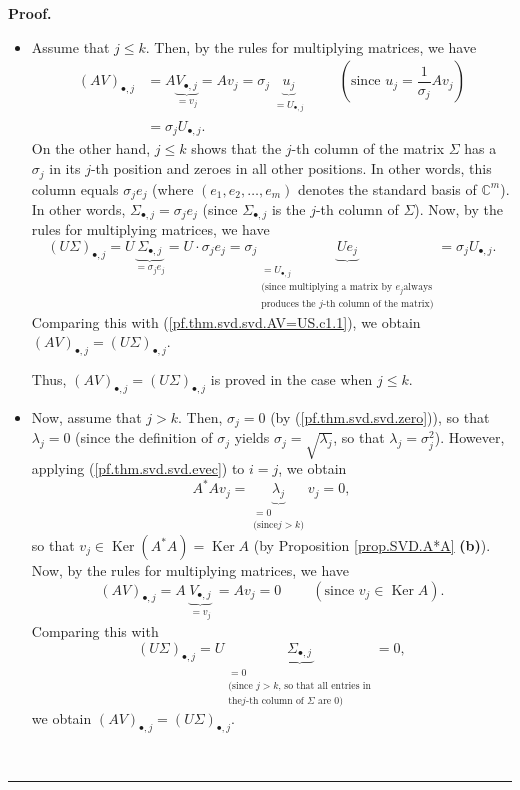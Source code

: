 \documentclass[numbers=enddot,12pt,final,onecolumn,notitlepage]{scrartcl}%
\numberwithin{exer}{subsection}
\theoremstyle{definition}
\newenvironment{proof}[1][Proof]{\noindent\textbf{#1.} }{\ \rule{0.5em}{0.5em}}
\begin{document}
\begin{proof}
\begin{itemize}
\item Assume that $j\leq k$. Then, by the rules for multiplying matrices, we
have%
\begin{align}
\left(  AV\right)  _{\bullet,j}  &  =A\underbrace{V_{\bullet,j}}_{=v_{j}%
}=Av_{j}=\sigma_{j}\underbrace{u_{j}}_{\substack{=U_{\bullet,j}}%
}\ \ \ \ \ \ \ \ \ \ \left(  \text{since }u_{j}=\dfrac{1}{\sigma_{j}}%
Av_{j}\right) \nonumber\\
&  =\sigma_{j}U_{\bullet,j}. \label{pf.thm.svd.svd.AV=US.c1.1}%
\end{align}
On the other hand, $j\leq k$ shows that the $j$-th column of the matrix
$\Sigma$ has a $\sigma_{j}$ in its $j$-th position and zeroes in all other
positions. In other words, this column equals $\sigma_{j}e_{j}$ (where
$\left(  e_{1},e_{2},\ldots,e_{m}\right)  $ denotes the standard basis of
$\mathbb{C}^{m}$). In other words, $\Sigma_{\bullet,j}=\sigma_{j}e_{j}$ (since
$\Sigma_{\bullet,j}$ is the $j$-th column of $\Sigma$). Now, by the rules for
multiplying matrices, we have%
\[
\left(  U\Sigma\right)  _{\bullet,j}=U\underbrace{\Sigma_{\bullet,j}}%
_{=\sigma_{j}e_{j}}=U\cdot\sigma_{j}e_{j}=\sigma_{j}\underbrace{Ue_{j}%
}_{\substack{=U_{\bullet,j}\\\text{(since multiplying a matrix by }e_{j}\text{
always}\\\text{produces the }j\text{-th column of the matrix)}}}=\sigma
_{j}U_{\bullet,j}.
\]
Comparing this with (\ref{pf.thm.svd.svd.AV=US.c1.1}), we obtain $\left(
AV\right)  _{\bullet,j}=\left(  U\Sigma\right)  _{\bullet,j}$.

Thus, $\left(  AV\right)  _{\bullet,j}=\left(  U\Sigma\right)  _{\bullet,j}$
is proved in the case when $j\leq k$.

\item Now, assume that $j>k$. Then, $\sigma_{j}=0$ (by
(\ref{pf.thm.svd.svd.zero})), so that $\lambda_{j}=0$ (since the definition of
$\sigma_{j}$ yields $\sigma_{j}=\sqrt{\lambda_{j}}$, so that $\lambda
_{j}=\sigma_{j}^{2}$). However, applying (\ref{pf.thm.svd.svd.evec}) to $i=j$,
we obtain%
\[
A^{\ast}Av_{j}=\underbrace{\lambda_{j}}_{\substack{=0\\\text{(since
}j>k\text{)}}}v_{j}=0,
\]
so that $v_{j}\in\operatorname*{Ker}\left(  A^{\ast}A\right)
=\operatorname*{Ker}A$ (by Proposition \ref{prop.SVD.A*A} \textbf{(b)}). Now,
by the rules for multiplying matrices, we have%
\[
\left(  AV\right)  _{\bullet,j}=A\underbrace{V_{\bullet,j}}_{\substack{=v_{j}%
}}=Av_{j}=0\ \ \ \ \ \ \ \ \ \ \left(  \text{since }v_{j}\in
\operatorname*{Ker}A\right)  .
\]
Comparing this with%
\[
\left(  U\Sigma\right)  _{\bullet,j}=U\underbrace{\Sigma_{\bullet,j}%
}_{\substack{=0\\\text{(since }j>k\text{, so that all entries in}\\\text{the
}j\text{-th column of }\Sigma\text{ are }0\text{)}}}=0,
\]
we obtain $\left(  AV\right)  _{\bullet,j}=\left(  U\Sigma\right)
_{\bullet,j}$.


\end{itemize}
\end{proof}
\end{document}
